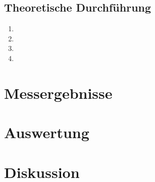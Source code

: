 \documentclass[12pt]{scrartcl}
\begin{document}
\subsection{Theoretische Durchführung}

\begin{enumerate}
\item
\item
\item
\item
\end{enumerate}

\section{Messergebnisse}



\section{Auswertung}


\section{Diskussion}


\end{document}
